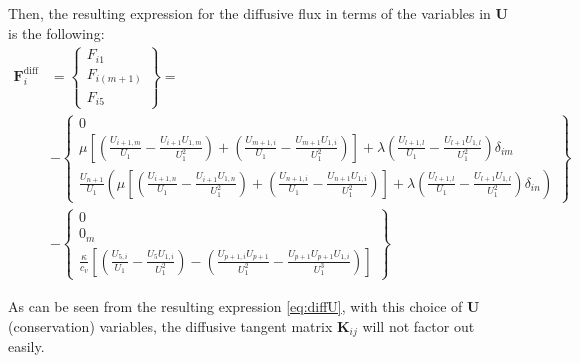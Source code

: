 \documentclass{ucb}
\begin{document}
\begin{enumerate}
Then, the resulting expression for the diffusive flux in terms of the variables in $\bm{U}$ is the following:
\begin{equation}
    \begin{aligned}
        \bm{F}_i^\mathrm{diff} &= 
        \begin{Bmatrix}
            F_{i1} \\
            F_{i(m+1)} \\
            F_{i5}
        \end{Bmatrix}
        = \\
        &-
        \begin{Bmatrix}
            0 \\
            \mu\left[\left(\frac{U_{i+1,m}}{U_1} - \frac{U_{i+1}U_{1,m}}{U_1^2}\right) + \left(\frac{U_{m+1,i}}{U_1} - \frac{U_{m+1}U_{1,i}}{U_1^2}\right)\right] + \lambda\left(\frac{U_{l+1,l}}{U_1} - \frac{U_{l+1}U_{1,l}}{U_1^2}\right)\delta_{im} \\
            \frac{U_{n+1}}{U_1} \left(\mu\left[\left(\frac{U_{i+1,n}}{U_1} - \frac{U_{i+1}U_{1,n}}{U_1^2}\right) + \left(\frac{U_{n+1,i}}{U_1} - \frac{U_{n+1}U_{1,i}}{U_1^2}\right)\right] + \lambda\left(\frac{U_{l+1,l}}{U_1} - \frac{U_{l+1}U_{1,l}}{U_1^2}\right)\delta_{in}\right)
        \end{Bmatrix} \\
        &-
        \begin{Bmatrix}
            0 \\
            0_m \\
            \frac{\kappa}{c_v}\left[\left(\frac{U_{5,i}}{U_1} - \frac{U_5U_{1,i}}{U_1^2}\right) - \left(\frac{U_{p+1,i}U_{p+1}}{U_1^2} - \frac{U_{p+1}U_{p+1}U_{1,i}}{U_1^3}\right)\right]
        \end{Bmatrix}
    \end{aligned}
    \label{eq:diffU}
\end{equation}

As can be seen from the resulting expression \eqref{eq:diffU}, with this choice of $\bm{U}$ (conservation) variables, the diffusive tangent matrix $\bm{K}_{ij}$ will not factor out easily.


\end{enumerate}
\end{document}
